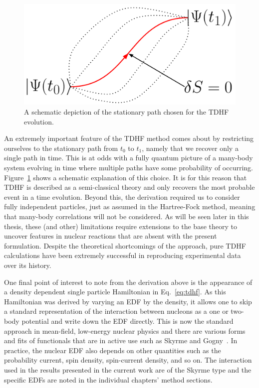 \begin{figure}[t]
	\includegraphics[width=\textwidth]{../Figures/intro_figs/paths.png}
	\caption{A schematic depiction of the stationary path chosen for the TDHF evolution.}
	\label{fig:paths}
\end{figure}

An extremely important feature of the TDHF method comes about by restricting ourselves to the stationary path from $t_0$ to $t_1$, namely that we recover only a single path in time.
This is at odds with a fully quantum picture of a many-body system evolving in time where multiple paths have some probability of occurring.
Figure~\ref{fig:paths} shows a schematic explanation of this choice.
It is for this reason that TDHF is described as a semi-classical theory and only recovers the most probable event in a time evolution.
Beyond this, the derivation required us to consider fully independent particles, just as assumed in the Hartree-Fock method, meaning that many-body correlations will not be considered.
As will be seen later in this thesis, these (and other) limitations require extensions to the base theory to uncover features in nuclear reactions that are absent with the present formulation.
Despite the theoretical shortcomings of the approach, pure TDHF calculations have been extremely successful in reproducing experimental data over its history.

One final point of interest to note from the derivation above is the appearance of a density dependent single particle Hamiltonian in Eq.~\ref{eq:tdhf}.
As this Hamiltonian was derived by varying an EDF by the density, it allows one to skip a standard representation of the interaction between nucleons as a one or two-body potential and write down the EDF directly.
This is now the standard approach in mean-field, low-energy nuclear physics and there are various forms and fits of functionals that are in active use such as Skyrme and Gogny~\citep{skyrme1956,decharge1980}.
In practice, the nuclear EDF also depends on other quantities such as the probability current, spin density, spin-current density, and so on.
The interaction used in the results presented in the current work are of the Skyrme type and the specific EDFs are noted in the individual chapters' method sections.


